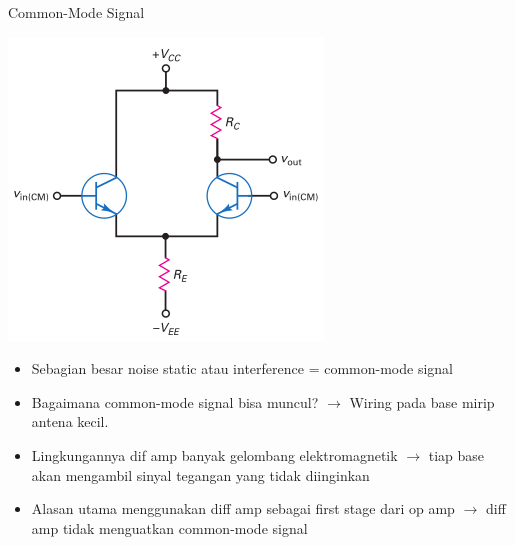 \documentclass[aspectratio=169]{beamer}
\begin{document}
\begin{frame}{Common-Mode Signal}
	\begin{multicols}{2}
		\begin{center}
			\includegraphics[height=0.7\textheight]{gambar/01.diff-amp/01.common-mode_input_signal}
		\end{center}
		\columnbreak
		\begin{itemize}
			\item Sebagian besar noise static atau interference = common-mode signal
			\item Bagaimana common-mode signal bisa muncul? $ \rightarrow $ Wiring pada base mirip antena kecil.
			\item Lingkungannya dif amp banyak gelombang elektromagnetik $ \rightarrow $ tiap base akan mengambil sinyal tegangan yang tidak diinginkan
			\item Alasan utama menggunakan diff amp sebagai first stage dari op amp $ \rightarrow $ diff amp tidak menguatkan common-mode signal
		\end{itemize}
	\end{multicols}
\end{frame}
\end{document}

